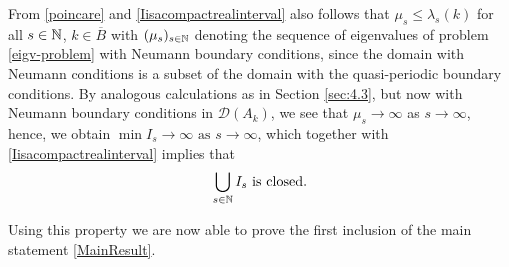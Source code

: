From \eqref{poincare} and \eqref{Iisacompactrealinterval} also follows that $\mu_{s} \leq \lambda_{s}(k)$ for all $s \in \mathbb{N}$, $k \in \overline{B}$ with $(\mu_{s})_{s \in \mathbb{N}}$ denoting the sequence of eigenvalues of problem \eqref{eigv-problem} with Neumann boundary conditions, since the domain with Neumann conditions is a subset of the domain with the quasi-periodic boundary conditions. By analogous calculations as in Section \ref{sec:4.3}, but now with Neumann boundary conditions in $\mathcal{D}(A_{k})$, we see that $\mu_{s} \rightarrow \infty$ as $s \rightarrow \infty$, hence, we obtain $\min I_{s} \rightarrow \infty \text{ as } s \rightarrow \infty$, which together with \eqref{Iisacompactrealinterval} implies that
	\begin{equation}
		\bigcup_{s \in \mathbb{N}} I_{s} \text{ is closed.} \label{UIclosed}
	\end{equation}

Using this property we are now able to prove the first inclusion of the main statement \eqref{MainResult}.	

